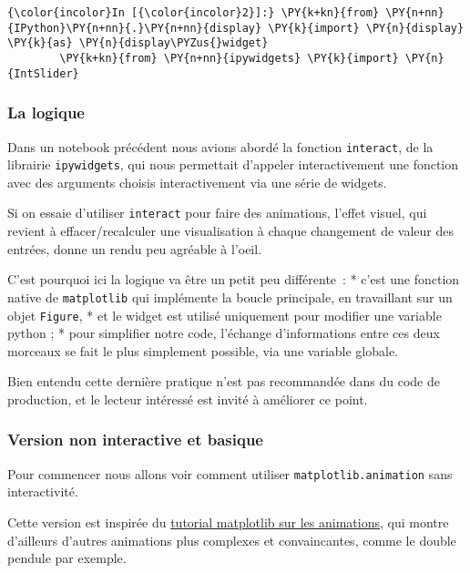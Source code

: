     \begin{Verbatim}[commandchars=\\\{\}]
{\color{incolor}In [{\color{incolor}2}]:} \PY{k+kn}{from} \PY{n+nn}{IPython}\PY{n+nn}{.}\PY{n+nn}{display} \PY{k}{import} \PY{n}{display} \PY{k}{as} \PY{n}{display\PYZus{}widget}
        \PY{k+kn}{from} \PY{n+nn}{ipywidgets} \PY{k}{import} \PY{n}{IntSlider}
\end{Verbatim}


    \hypertarget{la-logique}{%
\subsubsection{La logique}\label{la-logique}}

    Dans un notebook précédent nous avions abordé la fonction
\texttt{interact}, de la librairie \texttt{ipywidgets}, qui nous
permettait d'appeler interactivement une fonction avec des arguments
choisis interactivement via une série de widgets.

Si on essaie d'utiliser \texttt{interact} pour faire des animations,
l'effet visuel, qui revient à effacer/recalculer une visualisation à
chaque changement de valeur des entrées, donne un rendu peu agréable à
l'oeil.

C'est pourquoi ici la logique va être un petit peu différente~: * c'est
une fonction native de \texttt{matplotlib} qui implémente la boucle
principale, en travaillant sur un objet \texttt{Figure}, * et le widget
est utilisé uniquement pour modifier une variable python ; * pour
simplifier notre code, l'échange d'informations entre ces deux morceaux
se fait le plus simplement possible, via une variable globale.

Bien entendu cette dernière pratique n'est pas recommandée dans du code
de production, et le lecteur intéressé est invité à améliorer ce point.

    \hypertarget{version-non-interactive-et-basique}{%
\subsubsection{Version non interactive et
basique}\label{version-non-interactive-et-basique}}

    Pour commencer nous allons voir comment utiliser
\texttt{matplotlib.animation} sans interactivité.

Cette version est inspirée du
\href{https://jakevdp.github.io/blog/2012/08/18/matplotlib-animation-tutorial/}{tutorial
matplotlib sur les animations}, qui montre d'ailleurs d'autres
animations plus complexes et convaincantes, comme le double pendule par
exemple.

